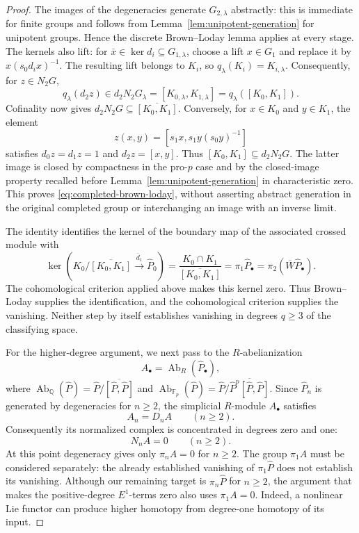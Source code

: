 \documentclass[11pt,a4paper]{article}
\begin{document}
\begin{proof}
The images of the degeneracies generate $G_{2,\lambda}$ abstractly:
this is immediate for finite groups and follows from
Lemma~\ref{lem:unipotent-generation} for unipotent groups.  Hence the discrete
Brown--Loday lemma \cite[Lemma~5.7]{BL} applies at every stage.
The kernels also lift: for $\bar x\in\ker d_i\subseteq G_{1,\lambda}$,
choose a lift $x\in G_1$ and replace it by
$x(s_0d_ix)^{-1}$.  The resulting lift belongs to $K_i$, so
$q_\lambda(K_i)=K_{i,\lambda}$.  Consequently, for $z\in N_2G$,
\[
 q_\lambda(d_2z)\in d_2N_2G_\lambda
 =[K_{0,\lambda},K_{1,\lambda}]
 =q_\lambda([K_0,K_1]).
\]
Cofinality now gives $d_2N_2G\subseteq\overline{[K_0,K_1]}$.
Conversely, for $x\in K_0$ and $y\in K_1$, the element
\[
 z(x,y)=[s_1x,s_1y(s_0y)^{-1}]
\]
satisfies $d_0z=d_1z=1$ and $d_2z=[x,y]$.
Thus $[K_0,K_1]\subseteq d_2N_2G$.  The latter image is closed by
compactness in the pro-$p$ case and by the closed-image property recalled before
Lemma~\ref{lem:unipotent-generation} in characteristic zero.  This proves \eqref{eq:completed-brown-loday}, without
asserting abstract generation in the original completed group or
interchanging an image with an inverse limit.

The identity identifies the kernel of the boundary map of the associated crossed
module with
\[
 \ker\!\left(K_0/\overline{[K_0,K_1]}\xrightarrow{\overline d_1}\widehat P_0\right)
 =\frac{K_0\cap K_1}{\overline{[K_0,K_1]}}
 =\pi_1\widehat P_\bullet=\pi_2(\overline W\widehat P_\bullet).
\]
The cohomological criterion applied above makes this kernel zero.
Thus Brown--Loday supplies the identification, and the cohomological
criterion supplies the vanishing.  Neither step by itself establishes
vanishing in degrees $q\geq3$ of the classifying space.

For the higher-degree argument, we next pass to the $R$-abelianization
\[
 A_\bullet=\operatorname{Ab}_R(\widehat P_\bullet),
\]
where $\operatorname{Ab}_{\mathbb Q}(\widehat P)=\widehat P/\overline{[\widehat P,\widehat P]}$ and
$\operatorname{Ab}_{\mathbb F_p}(\widehat P)=\widehat P/\overline{\widehat P^p[\widehat P,\widehat P]}$.  Since
$\widehat P_n$ is generated by degeneracies for $n\geq2$, the simplicial
$R$-module $A_\bullet$ satisfies
\[
 A_n=D_nA\qquad(n\geq2).
\]
Consequently its normalized complex is concentrated in degrees zero and
one:
\[
 N_nA=0\qquad(n\geq2).
\]
At this point degeneracy gives only $\pi_nA=0$ for $n\geq2$.
The group $\pi_1A$ must be considered separately: the already established
vanishing of $\pi_1\widehat P$ does not establish its vanishing.
Although our remaining target is $\pi_n\widehat P$ for $n\geq2$, the
argument that makes the positive-degree $E^1$-terms zero also uses
$\pi_1A=0$.  Indeed, a nonlinear Lie functor can produce higher homotopy
from degree-one homotopy of its input.


\end{proof}
\end{document}

